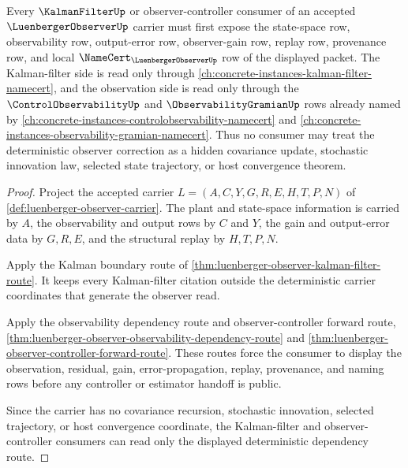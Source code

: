 \begin{theorem}
\label{thm:luenberger-observer-kalman-filter-dependency-route}
Every $\KalmanFilterUp$ or observer-controller consumer of an accepted $\LuenbergerObserverUp$ carrier must first expose the state-space row, observability row, output-error row, observer-gain row, replay row, provenance row, and local $\NameCert_{\LuenbergerObserverUp}$ row of the displayed packet. The Kalman-filter side is read only through \autoref{ch:concrete-instances-kalman-filter-namecert}, and the observation side is read only through the $\ControlObservabilityUp$ and $\ObservabilityGramianUp$ rows already named by \autoref{ch:concrete-instances-controlobservability-namecert} and \autoref{ch:concrete-instances-observability-gramian-namecert}. Thus no consumer may treat the deterministic observer correction as a hidden covariance update, stochastic innovation law, selected state trajectory, or host convergence theorem.
\end{theorem}
\begin{proof}
Project the accepted carrier $L=(A,C,Y,G,R,E,H,T,P,N)$ of \autoref{def:luenberger-observer-carrier}. The plant and state-space information is carried by $A$, the observability and output rows by $C$ and $Y$, the gain and output-error data by $G,R,E$, and the structural replay by $H,T,P,N$.

Apply the Kalman boundary route of \autoref{thm:luenberger-observer-kalman-filter-route}. It keeps every Kalman-filter citation outside the deterministic carrier coordinates that generate the observer read.

Apply the observability dependency route and observer-controller forward route, \autoref{thm:luenberger-observer-observability-dependency-route} and \autoref{thm:luenberger-observer-controller-forward-route}. These routes force the consumer to display the observation, residual, gain, error-propagation, replay, provenance, and naming rows before any controller or estimator handoff is public.

Since the carrier has no covariance recursion, stochastic innovation, selected trajectory, or host convergence coordinate, the Kalman-filter and observer-controller consumers can read only the displayed deterministic dependency route.
\end{proof}
